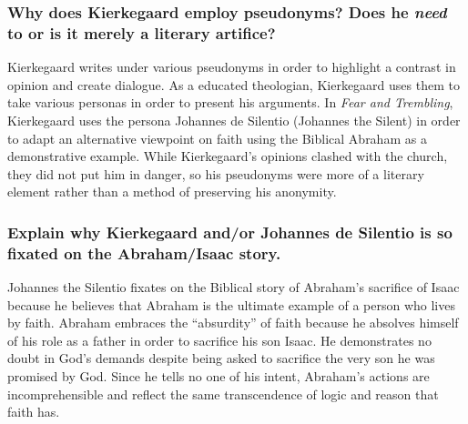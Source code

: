 \documentclass[letterpaper, 12pt]{article}
\begin{document}
\subsubsection*{Why does Kierkegaard employ pseudonyms? Does he \textit{need} to or is it merely a literary artifice?}
Kierkegaard writes under various pseudonyms in order to highlight a contrast in opinion and create dialogue. As a educated theologian, Kierkegaard uses them to take various personas in order to present his arguments. In \textit{Fear and Trembling}, Kierkegaard uses the persona Johannes de Silentio (Johannes the Silent) in order to adapt an alternative viewpoint on faith using the Biblical Abraham as a demonstrative example. While Kierkegaard's opinions clashed with the church, they did not put him in danger, so his pseudonyms were more of a literary element rather than a method of preserving his anonymity.

\subsubsection*{Explain why Kierkegaard and/or Johannes de Silentio is so fixated on the Abraham/Isaac story.}
Johannes the Silentio fixates on the Biblical story of Abraham's sacrifice of Isaac because he believes that Abraham is the ultimate example of a person who lives by faith. Abraham embraces the ``absurdity'' of faith because he absolves himself of his role as a father in order to sacrifice his son Isaac. He demonstrates no doubt in God's demands despite being asked to sacrifice the very son he was promised by God. Since he tells no one of his intent, Abraham's actions are incomprehensible and reflect the same transcendence of logic and reason that faith has.
\end{document}
